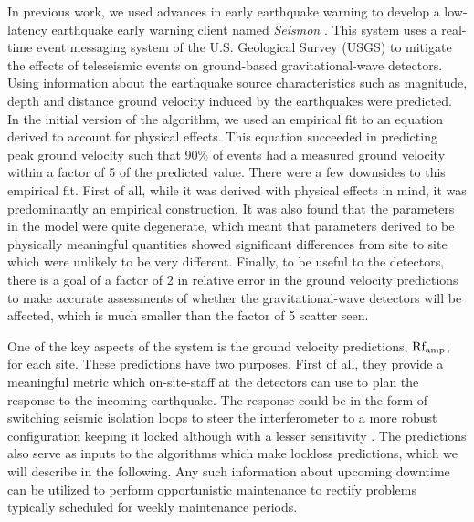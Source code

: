 \documentclass[twocolumn, aps, superscriptaddress]{revtex4}
\begin{document}
In previous work, we used advances in early earthquake warning to develop a low-latency earthquake early warning client named \emph{Seismon} \cite{CoEa2017}. This system uses a real-time event messaging system of the U.S. Geological Survey (USGS) to mitigate the effects of teleseismic events on ground-based gravitational-wave detectors. 
Using information about the earthquake source characteristics such as magnitude, depth and distance ground velocity induced by the earthquakes were predicted.
In the initial version of the algorithm, we used an empirical fit to an equation derived to account for physical effects. This equation succeeded in predicting peak ground velocity such that 90\% of events had a measured ground velocity within a factor of 5 of the predicted value.
There were a few downsides to this empirical fit.
First of all, while it was derived with physical effects in mind, it was predominantly an empirical construction.
It was also found that the parameters in the model were quite degenerate, which meant that parameters derived to be physically meaningful quantities showed significant differences from site to site which were unlikely to be very different. Finally, to be useful to the detectors, there is a goal of a factor of 2 in relative error in the ground velocity predictions to make accurate assessments of whether the gravitational-wave detectors will be affected, which is much smaller than the factor of 5 scatter seen. 

One of the key aspects of the system is the ground velocity predictions, $\rm Rf_{amp}$, for each site. These predictions have two purposes. 
First of all, they provide a meaningful metric which on-site-staff at the detectors can use to plan the response to the incoming earthquake. The response could be in the form of switching seismic isolation loops to steer the interferometer to a more robust configuration keeping it locked although with a lesser sensitivity \cite{BiWa2018}. The predictions also serve as inputs to the algorithms which make lockloss predictions, which we will describe in the following. Any such information about upcoming downtime can be utilized to perform opportunistic maintenance to rectify problems typically scheduled for weekly maintenance periods.
\end{document}
